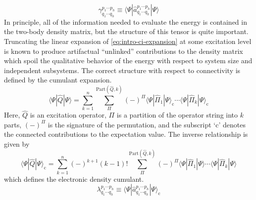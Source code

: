 \begin{equation}
    \gamma^{p_1\cdots p_h}_{q_1\cdots q_h}
    \equiv
    \langle\Psi|\hat{a}^{p_1\cdots p_h}_{q_1\cdots q_h}|\Psi\rangle
\end{equation}
In principle, all of the information needed to evaluate the energy is contained
in the two-body density matrix, but the structure of this tensor is quite
important.
Truncating the linear expansion of \cref{eq:intro-ci-expansion} at some
excitation level is known to produce artifactual ``unlinked'' contributions to
the density matrix which spoil the qualitative behavior of the energy with
respect to system size and independent subsystems.
The correct structure with respect to connectivity is defined by the cumulant
expansion.\cite{McCullagh:1987}
\begin{equation}
    \langle\Psi|\hat{Q}|\Psi\rangle
    =
    \sum_{k=1}^n
    \sum_{\Pi}^{\mathrm{Part}(\hat{Q}, k)}
    (-)^{\Pi}
    \langle\Psi|\hat{\Pi}_1|\Psi\rangle_\mathrm{c}
    \cdots
    \langle\Psi|\hat{\Pi}_k|\Psi\rangle_\mathrm{c}
\end{equation}
Here, \(\hat{Q}\) is an excitation operator, \(\Pi\) is a partition of the
operator string into \(k\) parts, \((-)^\Pi\) is the signature of the
permutation, and the subscript `\(\mathrm{c}\)' denotes the connected
contributions to the expectation value.
The inverse relationship is given by
\begin{equation}
    \langle\Psi|\hat{Q}|\Psi\rangle_\mathrm{c}
    =
    \sum_{k=1}^n
    (-)^{k+1}
    (k-1)!
    \sum_{\Pi}^{\mathrm{Part}(\hat{Q}, k)}
    (-)^{\Pi}
    \langle\Psi|\hat{\Pi}_1|\Psi\rangle
    \cdots
    \langle\Psi|\hat{\Pi}_k|\Psi\rangle
\end{equation}
which defines the electronic density cumulant.
\begin{equation}
    \lambda^{p_1\cdots p_h}_{q_1\cdots q_h}
    \equiv
    \langle\Psi|\hat{a}^{p_1\cdots p_h}_{q_1\cdots q_h}|\Psi\rangle_\mathrm{c}
\end{equation}

